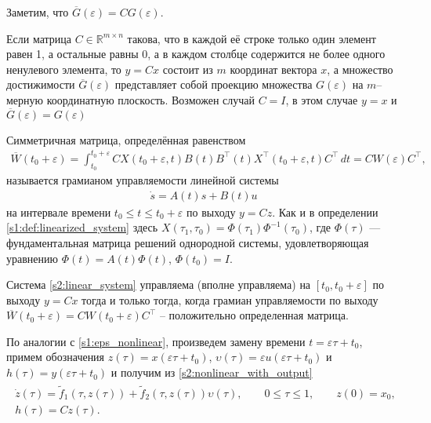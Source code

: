 \documentclass[../main.tex]{subfiles}
\begin{document}
Заметим, что  $ \overline{G}(\varepsilon) = C G(\varepsilon) $.    
    
Если матрица $ C \in \mathbb{R}^{m \times n} $ такова, что в каждой её строке только один элемент равен 1, а остальные равны 0, а в каждом столбце содержится не более одного ненулевого элемента, то $ y=Cx $ состоит из $ m$ координат вектора $ x $, а  множество достижимости $\overline{G}(\varepsilon)$ представляет собой проекцию множества $ G(\varepsilon) $ на $m$--мерную координатную плоскость. 
Возможен случай $C = I$, в этом случае $y = x$ и $ \overline{G}(\varepsilon) = G(\varepsilon)$


\begin{definition}
    Симметричная матрица, определённая равенством
    \begin{gather*}
        \overline{W}(t_0 + \varepsilon) = \int_{t_0}^{t_0+\varepsilon} C X(t_0+\varepsilon,t)B(t)B^{\top}(t)X^{\top}(t_0+\varepsilon,t) C^\top \, dt=CW(\varepsilon)C^\top,
    \end{gather*}
    называется грамианом управляемости линейной системы 
    \begin{gather}\label{s2:linear_system}
    	\dot{s} = A(t) s + B(t) u
    \end{gather}
    на интервале времени $  t_0 \leqslant t \leqslant t_0 + \varepsilon $ по выходу $y = C z$. 
    Как и в определении \ref{s1:def:linearized_system} здесь $X(\tau_1, \tau_0) = \Phi(\tau_1) \Phi^{−1}(\tau_0)$, где $\Phi(\tau)$ ---
    фундаментальная матрица решений однородной системы, удовлетворяющая уравнению
    $\Phi(t) = A(t) \Phi(t)$, $\Phi(t_0) = I$.
\end{definition}
    
Система \eqref{s2:linear_system} управляема (вполне управляема) на  $ [t_0, t_0 + \varepsilon] $ по выходу $y=Cx$ тогда и только тогда,
когда  грамиан управляемости по выходу $ \overline{W}(t_0 + \varepsilon) = C W(t_0 + \varepsilon) C^{\top}  $ -- положительно определенная матрица.
   
   
По аналогии с \eqref{s1:eps_nonlinear}, произведем замену времени $t = \varepsilon \tau + t_0$, примем обозначения $z(\tau) = x(\varepsilon \tau + t_0)$, $ \upsilon(\tau) = \varepsilon u(\varepsilon \tau + t_0) $ и $h(\tau) = y(\varepsilon \tau + t_0)$ и получим из \eqref{s2:nonlinear_with_output}
\begin{gather}\label{s2:eps_nonlinear_with_output}
\begin{gathered}
	\dot{z}(\tau)=\widetilde{f}_1(\tau,z(\tau))+\widetilde{f}_2(\tau,z(\tau))\upsilon(\tau), \qquad 0 \leqslant \tau \leqslant 1, \qquad z(0) = x_0, \\
	h(\tau) = C z(\tau).
\end{gathered}
\end{gather}
\end{document}
